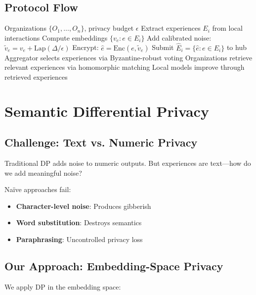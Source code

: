 \documentclass[11pt,letterpaper]{article}
\newcommand{\FDSO}{\textsc{fdso}}
\begin{document}
\subsection{Protocol Flow}

\begin{algorithm}
\caption{\FDSO{} Protocol}
\label{alg:fdso}
\begin{algorithmic}[1]
\REQUIRE Organizations $\{O_1, \ldots, O_n\}$, privacy budget $\epsilon$
    \STATE Extract experiences $E_i$ from local interactions
    \STATE Compute embeddings $\{v_e : e \in E_i\}$
    \STATE Add calibrated noise: $\tilde{v}_e = v_e + \text{Lap}(\Delta/\epsilon)$
    \STATE Encrypt: $\hat{e} = \text{Enc}(e, \tilde{v}_e)$
    \STATE Submit $\hat{E}_i = \{\hat{e} : e \in E_i\}$ to hub
\ENDFOR
\STATE Aggregator selects experiences via Byzantine-robust voting
\STATE Organizations retrieve relevant experiences via homomorphic matching
\STATE Local models improve through retrieved experiences
\end{algorithmic}
\end{algorithm}

\section{Semantic Differential Privacy}
\label{sec:privacy}

\subsection{Challenge: Text vs. Numeric Privacy}

Traditional DP adds noise to numeric outputs. But experiences are text---how do we add meaningful noise?

Na\"ive approaches fail:
\begin{itemize}
    \item \textbf{Character-level noise}: Produces gibberish
    \item \textbf{Word substitution}: Destroys semantics
    \item \textbf{Paraphrasing}: Uncontrolled privacy loss
\end{itemize}

\subsection{Our Approach: Embedding-Space Privacy}

We apply DP in the embedding space:
\end{document}
